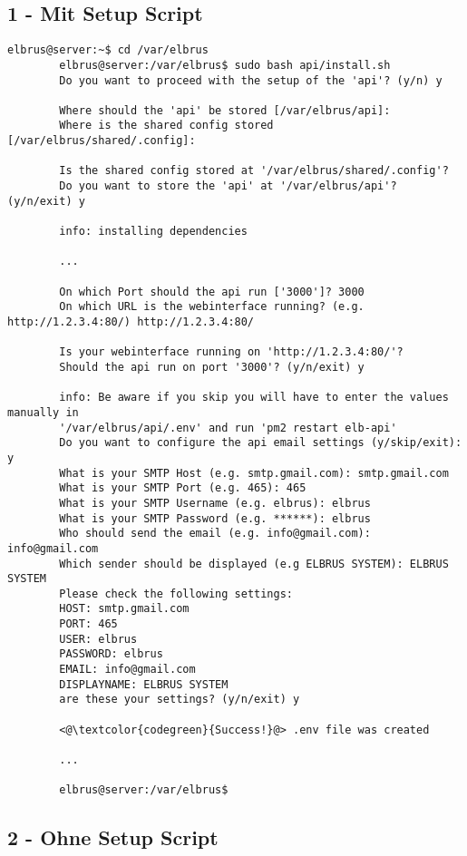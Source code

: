 	\subsection{1 - Mit Setup Script}
	
	\lstset{style=commands}
	\begin{lstlisting}[caption={Ausführen des 'install.sh' Scripts.}]
		elbrus@server:~$ cd /var/elbrus
		elbrus@server:/var/elbrus$ sudo bash api/install.sh
		Do you want to proceed with the setup of the 'api'? (y/n) y
		
		Where should the 'api' be stored [/var/elbrus/api]:
		Where is the shared config stored [/var/elbrus/shared/.config]:
		
		Is the shared config stored at '/var/elbrus/shared/.config'?
		Do you want to store the 'api' at '/var/elbrus/api'? (y/n/exit) y
		
		info: installing dependencies
		
		...
		
		On which Port should the api run ['3000']? 3000
		On which URL is the webinterface running? (e.g. http://1.2.3.4:80/) http://1.2.3.4:80/
		
		Is your webinterface running on 'http://1.2.3.4:80/'?
		Should the api run on port '3000'? (y/n/exit) y
		
		info: Be aware if you skip you will have to enter the values manually in 
		'/var/elbrus/api/.env' and run 'pm2 restart elb-api'
		Do you want to configure the api email settings (y/skip/exit): y
		What is your SMTP Host (e.g. smtp.gmail.com): smtp.gmail.com
		What is your SMTP Port (e.g. 465): 465
		What is your SMTP Username (e.g. elbrus): elbrus
		What is your SMTP Password (e.g. ******): elbrus
		Who should send the email (e.g. info@gmail.com): info@gmail.com
		Which sender should be displayed (e.g ELBRUS SYSTEM): ELBRUS SYSTEM
		Please check the following settings:
		HOST: smtp.gmail.com
		PORT: 465
		USER: elbrus
		PASSWORD: elbrus
		EMAIL: info@gmail.com
		DISPLAYNAME: ELBRUS SYSTEM
		are these your settings? (y/n/exit) y
		
		<@\textcolor{codegreen}{Success!}@> .env file was created
		
		...
		
		elbrus@server:/var/elbrus$
	\end{lstlisting}
	\newpage
	
	\subsection{2 - Ohne Setup Script}
